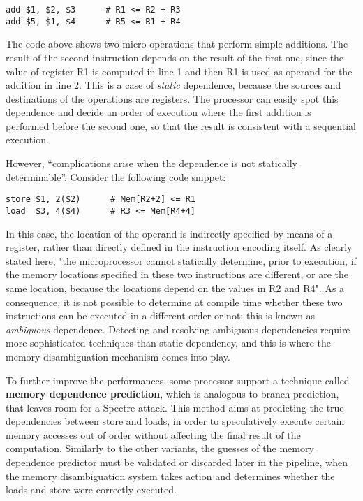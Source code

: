 \documentclass[target=mst,aauheader=aics]{thud}
\theoremstyle{definition}
\begin{document}
	\vspace{3mm}
	\begin{minipage}{.5\textwidth}
	\begin{lstlisting}
add $1, $2, $3      # R1 <= R2 + R3
add $5, $1, $4      # R5 <= R1 + R4
	\end{lstlisting}
	\end{minipage}
	
	The code above shows two micro-operations that perform simple additions. The result of the second instruction depends on the result of the first one, since the value of register R1 is computed in line 1 and then R1 is used as operand for the addition in line 2. This is a case of \textit{static} dependence, because the sources and destinations of the operations are registers. The processor can easily spot this dependence and decide an order of execution where the first addition is performed before the second one, so that the result is consistent with a sequential execution.
	
	However, ``complications arise when the dependence is not statically determinable''. Consider the following code snippet:
	
	\vspace{3mm}
	\begin{minipage}{.5\textwidth}
	\begin{lstlisting}
store $1, 2($2)      # Mem[R2+2] <= R1
load  $3, 4($4)      # R3 <= Mem[R4+4]
	\end{lstlisting}
	\end{minipage}

	In this case, the location of the operand is indirectly specified by means of a register, rather than directly defined in the instruction encoding itself. As clearly stated \href{https://en.wikipedia.org/wiki/Memory_disambiguation}{here}, "the microprocessor cannot statically determine, prior to execution, if the memory locations specified in these two instructions are different, or are the same location, because the locations depend on the values in R2 and R4". As a consequence, it is not possible to determine at compile time whether these two instructions can be executed in a different order or not: this is known as \textit{ambiguous} dependence. Detecting and resolving ambiguous dependencies require more sophisticated techniques than static dependency, and this is where the memory disambiguation mechanism comes into play.
	
	To further improve the performances, some processor support a technique called \textbf{memory dependence prediction}, which is analogous to branch prediction, that leaves room for a Spectre attack. This method aims at predicting the true dependencies between store and loads, in order to speculatively execute certain memory accesses out of order without affecting the final result of the computation. Similarly to the other variants, the guesses of the memory dependence predictor must be validated or discarded later in the pipeline, when the memory disambiguation system takes action and determines whether the loads and store were correctly executed.
\end{document}
